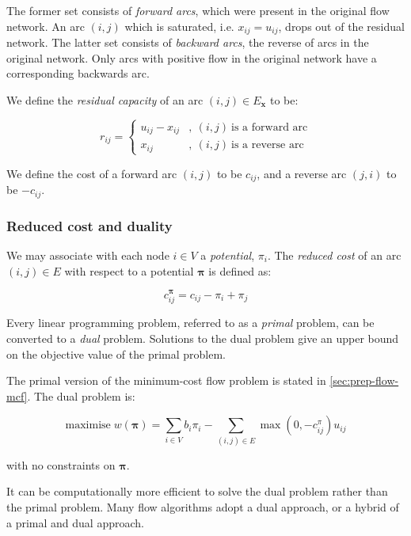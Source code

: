 The former set consists of \emph{forward arcs}, which were present
in the original flow network. An arc $(i,j)$ which is saturated,
i.e. $x_{ij}=u_{ij}$, drops out of the residual network. The latter
set consists of \emph{backward arcs}, the reverse of arcs in the original
network. Only arcs with positive flow in the original network have
a corresponding backwards arc.

We define the \emph{residual capacity} of an arc $(i,j)\in E_{\mathbf{x}}$
to be:

\begin{equation}
r_{ij}=\begin{cases}
u_{ij}-x_{ij} & ,\:(i,j)\:\mbox{is a forward arc}\\
x_{ij} & ,\:(i,j)\:\mbox{is a reverse arc}
\end{cases}
\end{equation}

We define the cost of a forward arc $(i,j)$ to be $c_{ij}$, and
a reverse arc $(j,i)$ to be $-c_{ij}$.


\subsubsection{Reduced cost and duality}

We may associate with each node $i\in V$ a \emph{potential}, $\pi_{i}$.
The \emph{reduced cost} of an arc $(i,j)\in E$ with respect to a
potential $\boldsymbol{\pi}$ is defined as:

\begin{equation}
c_{ij}^{\boldsymbol{\pi}}=c_{ij}-\pi_{i}+\pi_{j}
\end{equation}


Every linear programming problem, referred to as a \emph{primal} problem,
can be converted to a \emph{dual} problem. Solutions to the dual problem
give an upper bound on the objective value of the primal problem.

The primal version of the minimum-cost flow problem is stated in \ref{sec:prep-flow-mcf}.
The dual problem is:

\begin{equation}
\mathrm{maximise}\; w(\boldsymbol{\pi})=\sum_{i\in V}b_{i}\pi_{i}-\sum_{(i,j)\in E}\max\left(0,-c_{ij}^{\pi}\right)u_{ij}
\end{equation}

with no constraints on $\boldsymbol{\pi}$.

It can be computationally more efficient to solve the dual problem
rather than the primal problem. Many flow algorithms adopt a dual
approach, or a hybrid of a primal and dual approach.

